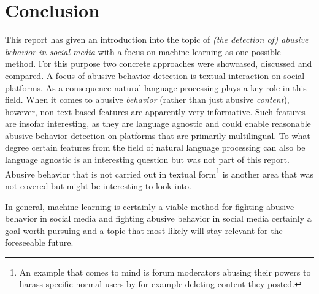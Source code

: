 \documentclass{proseminar}
\begin{document}
\section{Conclusion}
This report has given an introduction into the topic of \emph{(the detection of) abusive behavior in social media} with a focus on machine learning as one possible method. For this purpose two concrete approaches were showcased, discussed and compared. A focus of abusive behavior detection is textual interaction on social platforms. As a consequence natural language processing plays a key role in this field. When it comes to abusive \emph{behavior} (rather than just abusive \emph{content}), however, non text based features are apparently very informative. Such features are insofar interesting, as they are language agnostic and could enable reasonable abusive behavior detection on platforms that are primarily multilingual. To what degree certain features from the field of natural language processing can also be language agnostic is an interesting question but was not part of this report. Abusive behavior that is not carried out in textual form\footnote{An example that comes to mind is forum moderators abusing their powers to harass specific normal users by for example deleting content they posted.} is another area that was not covered but might be interesting to look into.

In general, machine learning is certainly a viable method for fighting abusive behavior in social media and fighting abusive behavior in social media certainly a goal worth pursuing and a topic that most likely will stay relevant for the foreseeable future.
\end{document}
